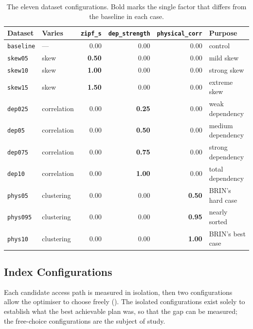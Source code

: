 \documentclass[12pt, a4paper]{article}
\begin{document}
\begin{table}[htbp]
\centering
\caption{The eleven dataset configurations. Bold marks the single factor
that differs from the baseline in each case.}
\label{tab:datasets}
\small
\begin{tabular}{@{}llrrrl@{}}
\toprule
\textbf{Dataset} & \textbf{Varies} & \texttt{zipf\_s} & \texttt{dep\_strength} & \texttt{physical\_corr} & \textbf{Purpose} \\
\midrule
\texttt{baseline} & --- & 0.00 & 0.00 & 0.00 & control \\
\midrule
\texttt{skew05} & skew & \textbf{0.50} & 0.00 & 0.00 & mild skew \\
\texttt{skew10} & skew & \textbf{1.00} & 0.00 & 0.00 & strong skew \\
\texttt{skew15} & skew & \textbf{1.50} & 0.00 & 0.00 & extreme skew \\
\midrule
\texttt{dep025} & correlation & 0.00 & \textbf{0.25} & 0.00 & weak dependency \\
\texttt{dep05} & correlation & 0.00 & \textbf{0.50} & 0.00 & medium dependency \\
\texttt{dep075} & correlation & 0.00 & \textbf{0.75} & 0.00 & strong dependency \\
\texttt{dep10} & correlation & 0.00 & \textbf{1.00} & 0.00 & total dependency \\
\midrule
\texttt{phys05} & clustering & 0.00 & 0.00 & \textbf{0.50} & BRIN's hard case \\
\texttt{phys095} & clustering & 0.00 & 0.00 & \textbf{0.95} & nearly sorted \\
\texttt{phys10} & clustering & 0.00 & 0.00 & \textbf{1.00} & BRIN's best case \\
\bottomrule
\end{tabular}
\end{table}

\subsection{Index Configurations}

Each candidate access path is measured in isolation, then two
configurations allow the optimiser to choose freely
(). The isolated configurations exist solely to establish
what the best achievable plan was, so that the gap can be measured; the
free-choice configurations are the subject of study.
\end{document}
